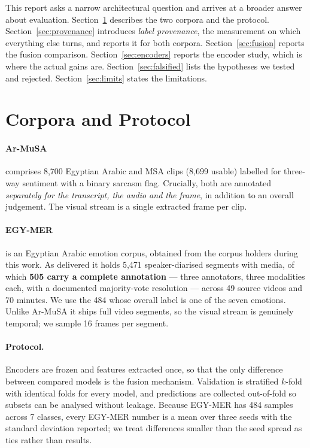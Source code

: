 \documentclass[12pt, a4paper]{article}
\begin{document}
This report asks a narrow architectural question and arrives at a broader answer
about evaluation. Section~\ref{sec:setup} describes the two corpora and the
protocol. Section~\ref{sec:provenance} introduces \emph{label provenance}, the
measurement on which everything else turns, and reports it for both corpora.
Section~\ref{sec:fusion} reports the fusion comparison.
Section~\ref{sec:encoders} reports the encoder study, which is where the actual
gains are. Section~\ref{sec:falsified} lists the hypotheses we tested and
rejected. Section~\ref{sec:limits} states the limitations.

\section{Corpora and Protocol}
\label{sec:setup}

\paragraph{Ar-MuSA} \citep{Khaled2025} comprises 8{,}700 Egyptian Arabic and MSA
clips (8{,}699 usable) labelled for three-way sentiment with a binary sarcasm
flag. Crucially, both are annotated \emph{separately for the transcript, the
audio and the frame}, in addition to an overall judgement. The visual stream is
a single extracted frame per clip.

\paragraph{EGY-MER} \citep{Hussein2025} is an Egyptian Arabic emotion corpus,
obtained from the corpus holders during this work. As delivered it holds 5{,}471
speaker-diarised segments with media, of which \textbf{505 carry a complete
annotation} --- three annotators, three modalities each, with a documented
majority-vote resolution --- across 49 source videos and 70 minutes. We use the
484 whose overall label is one of the seven emotions. Unlike Ar-MuSA it ships
full video segments, so the visual stream is genuinely temporal; we sample 16
frames per segment.

\paragraph{Protocol.} Encoders are frozen and features extracted once, so that
the only difference between compared models is the fusion mechanism.
Validation is stratified $k$-fold with identical folds for every model, and
predictions are collected out-of-fold so subsets can be analysed without
leakage. Because EGY-MER has 484 samples across 7 classes, every EGY-MER number
is a mean over three seeds with the standard deviation reported; we treat
differences smaller than the seed spread as ties rather than results.
\end{document}
